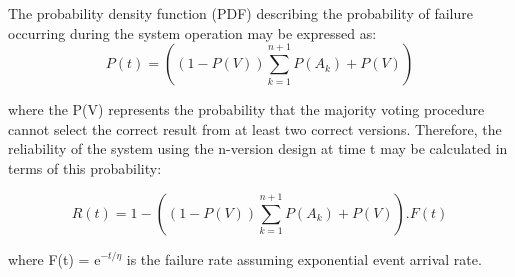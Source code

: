 The probability density function (PDF) describing the probability of failure occurring during the system operation may be expressed as:
\begin{equation}
P(t) = ( (1 - P(V))\sum_{k=1}^{n+1} P(A_{k})  + P(V) )
\label{eq:nversion2}
\end{equation}

where the P(V) represents the probability that the majority voting procedure cannot select the correct result from at least two correct versions. Therefore, the reliability of the system using the n-version design at time t may be calculated in terms of this probability:

\begin{equation}
R(t) = 1 - ( (1 - P(V))\sum_{k=1}^{n+1} P(A_{k})  + P(V) ). F(t)
\label{eq:nversion3}
\end{equation}

where F(t) = e$^{-t/\eta}$ is the failure rate assuming exponential event arrival rate.

